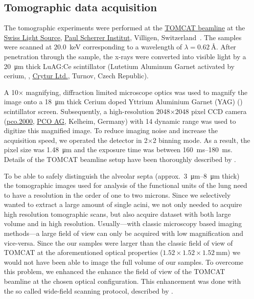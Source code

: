 \documentclass[%
	paper=a4,%
	DIV=calc,%
	twoside=true,%
	abstract=true,%
	]{scrartcl}
\newcommand{\todojcs}[2][]{\todo[color=magenta!62!white, #1]{Johannes: #2}}
\begin{document}
\subsection{Tomographic data acquisition\label{sec:tomcat}}
The tomographic experiments were performed at the \href{http://www.psi.ch/sls/tomcat/}{TOMCAT beamline} at the \href{http://www.psi.ch/sls/}{Swiss Light Source}, \href{http://www.psi.ch/}{Paul Scherrer Institut}, Villigen, Switzerland~\cite{Stampanoni2006a}. The samples were scanned at \SI{20.0}{\kilo\electronvolt} corresponding to a wavelength of \(\lambda=\SI{0.62}{\angstrom}\). %
After penetration through the sample, the x-rays were converted into visible light by a \SI{20}{\micro\meter} thick LuAG:Ce scintillator (Lutetium Aluminum Garnet activated by cerium, , \href{http://www.crytur.cz/}{Crytur Ltd.}, Turnov, Czech Republic).

A 10\(\times\) magnifying, diffraction limited microscope optics was used to magnify the image onto a \SI{18}{\micro\meter} thick Cerium doped Yttrium Aluminium Garnet (YAG) () scintillator screen. Subsequently, a high-resolution 2048\(\times\)2048 pixel CCD camera (\href{http://www.pco.de/sensitive-cameras/pco2000/}{pco.2000}, \href{http://www.pco.de/}{PCO AG}, Kelheim, Germany) with \SI{14}{\bit} dynamic range was used to digitize this magnified image. To reduce imaging noise and increase the acquisition speed, we operated the detector in 2\(\times\)2 binning mode. As a result, the pixel size was \SI{1.48}{\micro\meter} and the exposure time was between \SIrange{160}{180}{\milli\second}. Details of the TOMCAT beamline setup have been thoroughly described by \citet{Stampanoni2006a}.

To be able to safely distinguish the alveolar septa (approx.~\SIrange{3}{8}{\micro\meter} thick\todojcs{Correct thickness? Who should we cite?}) the tomographic images used for analysis of the functional units of the lung need to have a resolution in the order of one to two microns. Since we selectively wanted to extract a large amount of single acini, we not only needed to acquire high resolution tomographic scans, but also acquire dataset with both large volume and in high resolution. Usually---with classic microscopy based imaging methods---a large field of view can only be acquired with low magnification and vice-versa. Since the our samples were larger than the classic field of view of TOMCAT at the aforementioned optical properties (\(1.52\times1.52\times\SI{1.52}{\milli\meter}\)) we would not have been able to image the full volume of our samples. To overcome this problem, we enhanced the enhance the field of view of the TOMCAT beamline at the chosen optical configuration. This enhancement was done with the so called wide-field scanning protocol, described by \citet{Haberthuer2010}.
\end{document}
